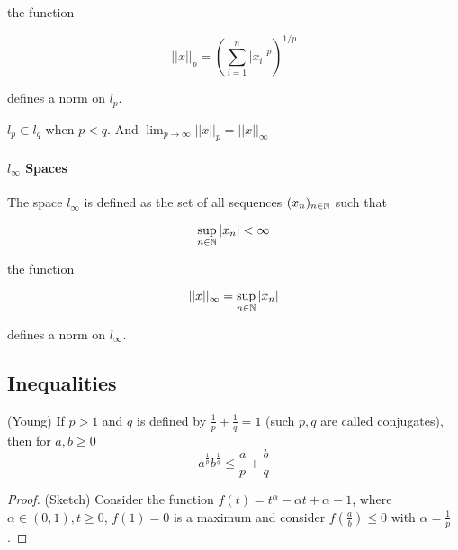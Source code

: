 \documentclass{article}
\begin{document}
the function  

\begin{equation*}
    ||x||_p = \left(\sum_{i=1}^n |x_i|^p\right)^{1/p}
\end{equation*}  

defines a norm on $l_p$.  
\begin{remark}
    $l_p \subset l_q$ when $p < q$. And $\lim_{p\to \infty} ||x||_p = ||x||_{\infty}$
\end{remark}
\paragraph*{$l_\infty$ Spaces}  
The space $l_\infty$ is defined as the set of all sequences $(x_n)_{n\in \mathbb{N}}$ such that

\begin{equation*}
    \sup_{n\in \mathbb{N}} |x_n| < \infty
\end{equation*}

the function

\begin{equation*}
    ||x||_\infty = \sup_{n\in \mathbb{N}} |x_n|
\end{equation*}

defines a norm on $l_\infty$.


\subsection{Inequalities}

\begin{prop}
\label{young}
(Young) If $p>1$ and $q$ is defined by $\frac{1}{p}+\frac{1}{q}=1$ (such $p,q$ are called conjugates), then for $a,b \geq 0$  
\begin{equation}
    a^{\frac{1}{p}}b^{\frac{1}{q}} \leq \frac{a}{p} + \frac{b}{q} 
\end{equation}
\end{prop}  

\begin{proof}
    (Sketch) Consider the function $f(t) = t^{\alpha}-\alpha t+\alpha-1$, where $\alpha \in (0,1), t\geq 0$,
    $f(1)=0$ is a maximum and consider $f(\frac{a}{b})\leq 0$ with $\alpha=\frac{1}{p}$.  
\end{proof}
\end{document}
